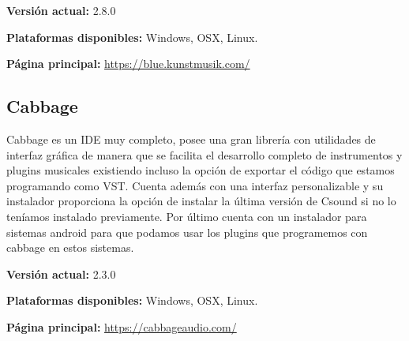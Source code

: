 \textbf{Versión actual: }	2.8.0\bigskip

\textbf{Plataformas disponibles: } Windows, OSX, Linux.\bigskip

\textbf{Página principal: } \url{https://blue.kunstmusik.com/}


\subsection{Cabbage}
Cabbage es un IDE muy completo, posee una gran librería con utilidades de interfaz gráfica de manera que se facilita el desarrollo completo de instrumentos y plugins musicales existiendo incluso la opción de exportar el código que estamos programando como VST. Cuenta además con una interfaz personalizable y su instalador proporciona la opción de instalar la última versión de Csound si no lo teníamos instalado previamente. Por último cuenta con un instalador para sistemas android para que podamos usar los plugins que programemos con cabbage en estos sistemas.\bigskip

\textbf{Versión actual: }	2.3.0\bigskip

\textbf{Plataformas disponibles: } Windows, OSX, Linux.\bigskip

\textbf{Página principal: } \url{https://cabbageaudio.com/}



 
